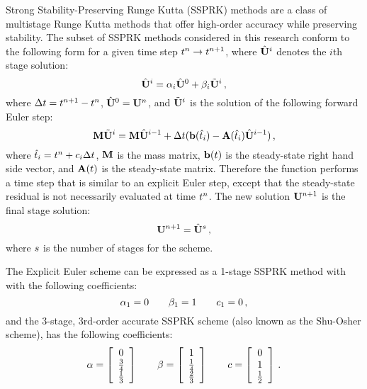 Strong Stability-Preserving Runge Kutta (SSPRK) methods are a class of multistage
Runge Kutta methods that offer high-order accuracy while preserving stability.
The subset of SSPRK methods considered in this research conform to the
following form for a given time step $t^n\rightarrow
t^{n+1}$,
where $\hat{\mathbf{U}}^i$ denotes the $i$th stage solution:
\begin{equation}
  \hat{\mathbf{U}}^i = \alpha_i\hat{\mathbf{U}}^0
  + \beta_i\tilde{\mathbf{U}}^i \,,
\end{equation}
where $\Delta t=t^{n+1}-t^n$,
$\hat{\mathbf{U}}^0=\mathbf{U}^n$, and
$\tilde{\mathbf{U}}^i$ is the solution of the following forward Euler
step:
\begin{equation}
   \mathbf{M}\tilde{\mathbf{U}}^i = \mathbf{M}\hat{\mathbf{U}}^{i-1}
   + \Delta t(\mathbf{b}(\hat{t}_i)
   - \mathbf{A}(\hat{t}_i)\hat{\mathbf{U}}^{i-1}) \,,
\end{equation}
where $\hat{t}_i = t^n+c_i\Delta t$,
$\mathbf{M}$ is the mass matrix, $\mathbf{b}(t)$ is the steady-state
right hand side vector, and $\mathbf{A}(t)$ is the steady-state matrix.
Therefore the function performs a time step that is similar to an explicit
Euler step, except that the steady-state residual is not necessarily evaluated
at time $t^n$. The new solution
$\mathbf{U}^{n+1}$ is the final stage solution:
\begin{equation}
   \mathbf{U}^{n+1} = \hat{\mathbf{U}}^s \,,
\end{equation}
where $s$ is the number of stages for the scheme.

The Explicit Euler scheme can be expressed as a 1-stage SSPRK method with
with the following coefficients:
\begin{equation}
   \alpha_1 = 0\qquad\beta_1 = 1\qquad c_1
   = 0 \,,
\end{equation}
and the 3-stage, 3rd-order accurate SSPRK scheme (also known as the Shu-Osher
scheme), has the following coefficients:
\begin{equation}
  \alpha = \left[\begin{array}{c}
    0\\\frac{3}{4}\\\frac{1}{3}\end{array}\right]
  \qquad\beta = \left[\begin{array}{c}
    1\\\frac{1}{4}\\\frac{2}{3}\end{array}\right]
  \qquad c = \left[\begin{array}{c}0\\1\\\frac{1}{2}\end{array}\right] \,.
\end{equation}
